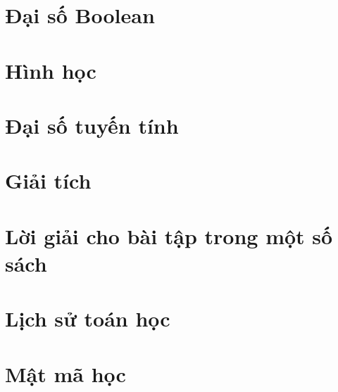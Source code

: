 \documentclass[oneside]{book}
\begin{document}
\part{Đại số Boolean}


\part{Hình học}



\part{Đại số tuyến tính}



\part{Giải tích}





\part{Lời giải cho bài tập trong một số sách}




\part{Lịch sử toán học}


\part{Mật mã học}





\medskip


\end{document}
